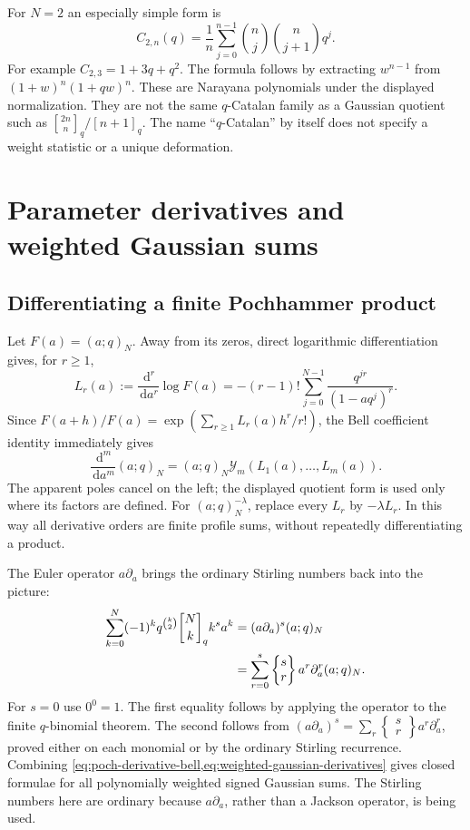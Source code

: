 \documentclass[11pt,a4paper]{article}
\numberwithin{equation}{section}
\theoremstyle{definition}
\theoremstyle{remark}
\newcommand{\G}[2]{\genfrac{[}{]}{0pt}{}{#1}{#2}_{q}}
\newcommand{\Sg}[2]{\left\{\begin{matrix}#1\\#2\end{matrix}\right\}}
\newcommand{\dd}{\,\mathrm d}
\newcommand{\Y}{\mathcal Y}
\begin{document}
For $N=2$ an especially simple form is
\begin{equation}
 C_{2,n}(q)=\frac1n\sum_{j=0}^{n-1}
                \binom nj\binom n{j+1}q^j.
 \label{eq:narayana-slot}
\end{equation}
For example $C_{2,3}=1+3q+q^2$. The formula follows by extracting
$w^{n-1}$ from $(1+w)^n(1+qw)^n$.
These are Narayana polynomials under the displayed normalization.
They are not the same $q$-Catalan family as a Gaussian quotient such as
$\G{2n}n/[n+1]_q$. The name ``$q$-Catalan'' by itself does not specify
a weight statistic or a unique deformation.

\section{Parameter derivatives and weighted Gaussian sums}
\label{sec:derivatives}

\subsection{Differentiating a finite Pochhammer product}
Let $F(a)=(a;q)_N$. Away from its zeros, direct logarithmic
differentiation gives, for $r\ge1$,
\begin{equation}
 L_r(a):=\frac{\dd^r}{\dd a^r}\log F(a)
 =-(r-1)!\sum_{j=0}^{N-1}\frac{q^{jr}}{(1-aq^j)^r}.
 \label{eq:poch-log-derivative}
\end{equation}
Since $F(a+h)/F(a)=\exp(\sum_{r\ge1}L_r(a)h^r/r!)$, the Bell
coefficient identity immediately gives
\begin{equation}
 \frac{\dd^m}{\dd a^m}(a;q)_N
   =(a;q)_N\Y_m(L_1(a),\ldots,L_m(a)).
 \label{eq:poch-derivative-bell}
\end{equation}
The apparent poles cancel on the left; the displayed quotient form is
used only where its factors are defined. For $(a;q)_N^{-\lambda}$,
replace every $L_r$ by $-\lambda L_r$. In this way all derivative orders
are finite profile sums, without repeatedly differentiating a product.

The Euler operator $a\partial_a$ brings the ordinary Stirling numbers
back into the picture:
\begin{align}
 \sum_{k=0}^N(-1)^kq^{\binom k2}\G Nk k^s a^k
   &=(a\partial_a)^s(a;q)_N \notag\\
   &=\sum_{r=0}^s\Sg sr a^r\partial_a^r(a;q)_N.
 \label{eq:weighted-gaussian-derivatives}
\end{align}
For $s=0$ use $0^0=1$. The first equality follows by applying the
operator to the finite $q$-binomial theorem. The second follows from
$(a\partial_a)^s=\sum_r\Sg sr a^r\partial_a^r$, proved either on each
monomial or by the ordinary Stirling recurrence. Combining
\cref{eq:poch-derivative-bell,eq:weighted-gaussian-derivatives} gives
closed formulae for all polynomially weighted signed Gaussian sums.
The Stirling numbers here are ordinary because $a\partial_a$, rather
than a Jackson operator, is being used.
\end{document}
